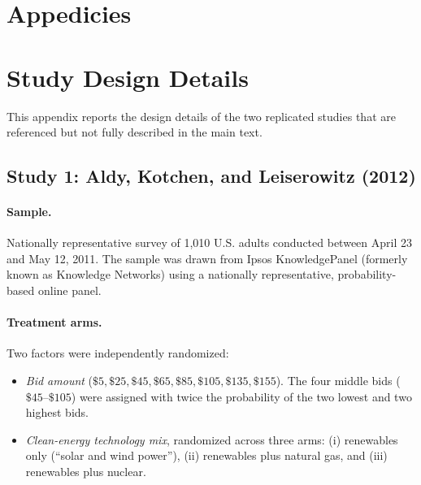 \documentclass[12pt]{article}
\begin{document}
\label{tab:cross-study}

\newpage
\section*{Appedicies}
\appendix
\renewcommand{\thefigure}{\thesection.\arabic{figure}}
\renewcommand{\thetable}{\thesection.\arabic{table}}

\section{Study Design Details}\label{app:study-details}

This appendix reports the design details of the two replicated studies that are referenced but not fully described in the main text.

\subsection{Study 1: Aldy, Kotchen, and Leiserowitz (2012)}

\paragraph{Sample.} Nationally representative survey of 1{,}010 U.S. adults conducted between April 23 and May 12, 2011. The sample was drawn from Ipsos KnowledgePanel (formerly known as Knowledge Networks) using a nationally representative, probability-based online panel.

\paragraph{Treatment arms.} Two factors were independently randomized:
\begin{itemize}[noitemsep]
    \item \textit{Bid amount} ($\$5, \$25, \$45, \$65, \$85, \$105, \$135, \$155$). The four middle bids ($\$45$--$\$105$) were assigned with twice the probability of the two lowest and two highest bids.
    \item \textit{Clean-energy technology mix}, randomized across three arms: (i) renewables only (``solar and wind power''), (ii) renewables plus natural gas, and (iii) renewables plus nuclear.
\end{itemize}
\end{document}
